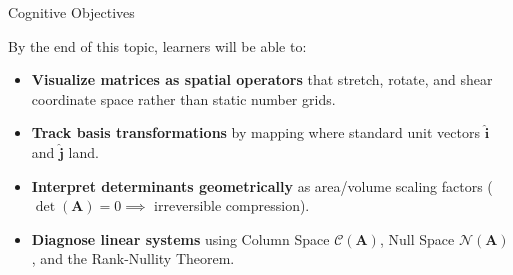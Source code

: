 \documentclass[../m00-session-02.tex]{subfiles}
\begin{document}

\begin{frame}{Cognitive Objectives}
  \begin{LearningObjectives}{By the end of this topic, learners will be able to:}
    \begin{itemize}\setlength{\itemsep}{0.28em}
      \item \textbf{Visualize matrices as spatial operators} that stretch, rotate, and shear coordinate space rather than static number grids.
      \item \textbf{Track basis transformations} by mapping where standard unit vectors $\hat{\mathbf{i}}$ and $\hat{\mathbf{j}}$ land.
      \item \textbf{Interpret determinants geometrically} as area/volume scaling factors ($\det(\mathbf{A}) = 0 \implies$ irreversible compression).
      \item \textbf{Diagnose linear systems} using Column Space $\mathcal{C}(\mathbf{A})$, Null Space $\mathcal{N}(\mathbf{A})$, and the Rank-Nullity Theorem.
    \end{itemize}
  \end{LearningObjectives}
\end{frame}
\end{document}
